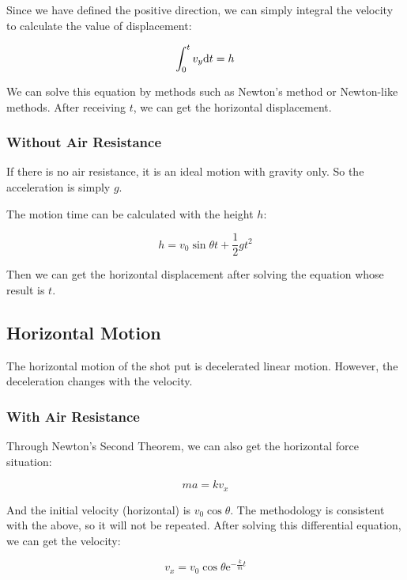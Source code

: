 \documentclass{article}
\begin{document}
Since we have defined the positive direction, we can simply integral the velocity to calculate the value of displacement:

\begin{equation}
    \int^t_0v_y\mathrm{d} t=h
\end{equation}

We can solve this equation by methods such as Newton's method or Newton-like methods. After receiving $t$, we can get the horizontal displacement.

\subsubsection{Without Air Resistance}

If there is no air resistance, it is an ideal motion with gravity only. So the acceleration is simply $g$.

The motion time can be calculated with the height $h$:

\begin{equation}
    h = v_0\sin\theta t + \dfrac{1}{2}gt^2
\end{equation}

Then we can get the horizontal displacement after solving the equation whose result is $t$.

\subsection{Horizontal Motion}

The horizontal motion of the shot put is decelerated linear motion. However, the deceleration changes with the velocity.

\subsubsection{With Air Resistance}

Through Newton's Second Theorem, we can also get the horizontal force situation:

\begin{equation*}
    ma = kv_x
\end{equation*}

And the initial velocity (horizontal) is $v_0\cos\theta$. The methodology is consistent with the above, so it will not be repeated. After solving this differential equation, we can get the velocity:

\begin{equation}
    v_x=v_0\cos\theta\mathrm{e}^{-\frac{k}{m}t}
\end{equation}
\end{document}
